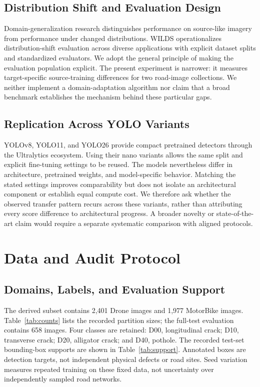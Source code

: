 \documentclass[conference,a4paper]{IEEEtran}
\begin{document}
\subsection{Distribution Shift and Evaluation Design}
Domain-generalization research distinguishes performance on source-like imagery from performance under changed distributions\cite{zhou2023survey}. WILDS operationalizes distribution-shift evaluation across diverse applications with explicit dataset splits and standardized evaluators\cite{koh2021wilds}. We adopt the general principle of making the evaluation population explicit. The present experiment is narrower: it measures target-specific source-training differences for two road-image collections. We neither implement a domain-adaptation algorithm nor claim that a broad benchmark establishes the mechanism behind these particular gaps.

\subsection{Replication Across YOLO Variants}
YOLOv8, YOLO11, and YOLO26 provide compact pretrained detectors through the Ultralytics ecosystem\cite{ultralyticsyolov8,jocher2024yolo11,ultralyticsyolo26}. Using their nano variants allows the same split and explicit fine-tuning settings to be reused. The models nevertheless differ in architecture, pretrained weights, and model-specific behavior. Matching the stated settings improves comparability but does not isolate an architectural component or establish equal compute cost. We therefore ask whether the observed transfer pattern recurs across these variants, rather than attributing every score difference to architectural progress. A broader novelty or state-of-the-art claim would require a separate systematic comparison with aligned protocols.

\section{Data and Audit Protocol}
\subsection{Domains, Labels, and Evaluation Support}
The derived subset contains 2,401 Drone images and 1,977 MotorBike images. Table~\ref{tab:counts} lists the recorded partition sizes; the full-test evaluation contains 658 images. Four classes are retained: D00, longitudinal crack; D10, transverse crack; D20, alligator crack; and D40, pothole. The recorded test-set bounding-box supports are shown in Table~\ref{tab:support}. Annotated boxes are detection targets, not independent physical defects or road sites. Seed variation measures repeated training on these fixed data, not uncertainty over independently sampled road networks.
\end{document}
